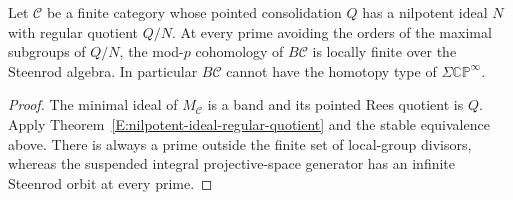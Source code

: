 \begin{corollary}\label{E:category-regular-nilpotent-scope}
Let $\mathcal C$ be a finite category whose pointed consolidation $Q$
has a nilpotent ideal $N$ with regular quotient $Q/N$.  At every prime
avoiding the orders of the maximal subgroups of $Q/N$, the mod-$p$
cohomology of $B\mathcal C$ is locally finite over the Steenrod algebra.
In particular $B\mathcal C$ cannot have the homotopy type of
$\Sigma\mathbb{CP}^{\infty}$.
\end{corollary}

\begin{proof}
The minimal ideal of $M_{\mathcal C}$ is a band and its pointed Rees
quotient is $Q$.  Apply
Theorem~\ref{E:nilpotent-ideal-regular-quotient} and the stable
equivalence above.  There is always a prime outside the finite set of
local-group divisors, whereas the suspended integral projective-space
generator has an infinite Steenrod orbit at every prime.
\end{proof}
